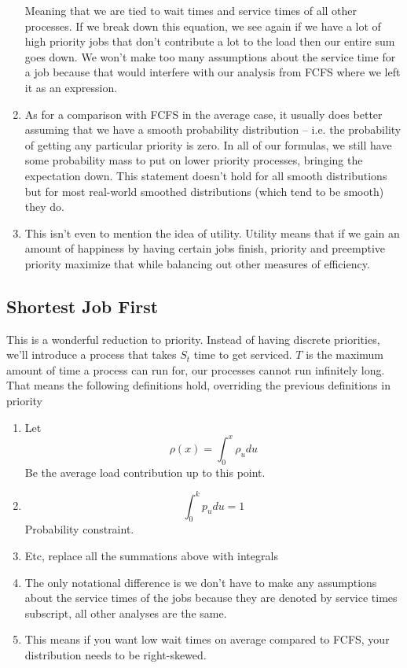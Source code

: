 \begin{enumerate}
  Meaning that we are tied to wait times and service times of all other processes.
  If we break down this equation, we see again if we have a lot of high priority jobs that don't contribute a lot to the load then our entire sum goes down.
  We won't make too many assumptions about the service time for a job because that would interfere with our analysis from FCFS where we left it as an expression.

  \item As for a comparison with FCFS in the average case, it usually does better assuming that we have a smooth probability distribution -- i.e. the probability of getting any particular priority is zero.
  In all of our formulas, we still have some probability mass to put on lower priority processes, bringing the expectation down.
  This statement doesn't hold for all smooth distributions but for most real-world smoothed distributions (which tend to be smooth) they do.

\item This isn't even to mention the idea of utility.
  Utility means that if we gain an amount of happiness by having certain jobs finish, priority and preemptive priority maximize that while balancing out other measures of efficiency.
\end{enumerate}


\subsection{Shortest Job First}
This is a wonderful reduction to priority.
Instead of having discrete priorities, we'll introduce a process that takes $S_t$ time to get serviced.
$T$ is the maximum amount of time a process can run for, our processes cannot run infinitely long.
That means the following definitions hold, overriding the previous definitions in priority

\begin{enumerate}
\item Let
  \[
  \rho(x) = \int_0^x \rho_u du
  \]
  Be the average load contribution up to this point.
\item
  \[
  \int_0^k p_u du = 1
  \] Probability constraint.
\item Etc, replace all the summations above with integrals
\item The only notational difference is we don't have to make any assumptions about the service times of the jobs because they are denoted by service times subscript, all other analyses are the same.
  \item This means if you want low wait times on average compared to FCFS, your distribution needs to be right-skewed.
\end{enumerate}

